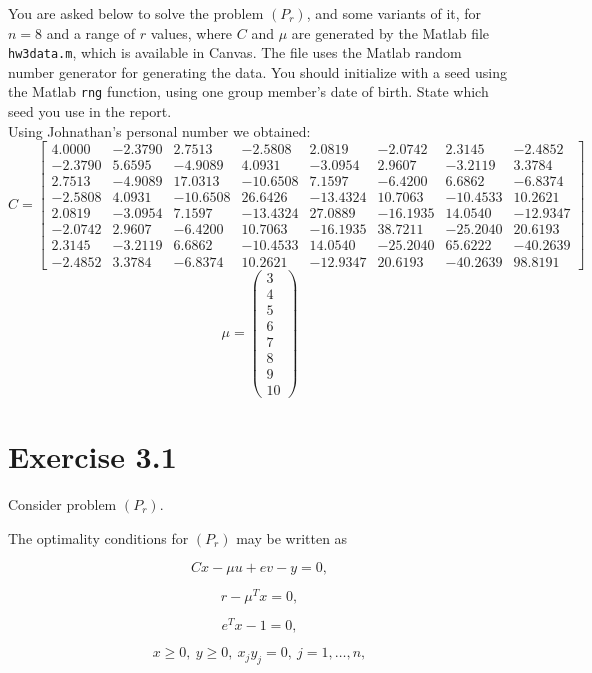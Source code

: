 \documentclass{assignment}
\begin{document}
You are asked below to solve the problem $(P_r)$, and some variants of it, for $n=8$ and a
range of $r$ values, where $C$ and $\mu$ are generated by the Matlab file \texttt{hw3data.m}, which is
available in Canvas. The file uses the Matlab random number generator for generating the
data. You should initialize with a seed using the Matlab \texttt{rng} function, using one group
member's date of birth. State which seed you use in the report.
\\
Using Johnathan's personal number we obtained:
$$ C = 
\begin{bmatrix}
4.0000 & -2.3790 & 2.7513 & -2.5808 & 2.0819 & -2.0742 & 2.3145 & -2.4852 \\
-2.3790 & 5.6595 & -4.9089 & 4.0931 & -3.0954 & 2.9607 & -3.2119 & 3.3784 \\
2.7513 & -4.9089 & 17.0313 & -10.6508 & 7.1597 & -6.4200 & 6.6862 & -6.8374 \\
-2.5808 & 4.0931 & -10.6508 & 26.6426 & -13.4324 & 10.7063 & -10.4533 & 10.2621 \\
2.0819 & -3.0954 & 7.1597 & -13.4324 & 27.0889 & -16.1935 & 14.0540 & -12.9347 \\
-2.0742 & 2.9607 & -6.4200 & 10.7063 & -16.1935 & 38.7211 & -25.2040 & 20.6193 \\
2.3145 & -3.2119 & 6.6862 & -10.4533 & 14.0540 & -25.2040 & 65.6222 & -40.2639 \\
-2.4852 & 3.3784 & -6.8374 & 10.2621 & -12.9347 & 20.6193 & -40.2639 & 98.8191
\end{bmatrix} $$
$$ \mu = \left(\begin{array}{c} 3\\ 4\\ 5\\ 6\\ 7\\ 8\\ 9\\ 10 \end{array}\right)$$
\newpage
\section*{Exercise 3.1}
Consider problem $(P_r)$.

The optimality conditions for $(P_r)$ may be written as

\[
Cx - \mu u + ev - y = 0,
\]

\[
r - \mu^T x = 0,
\]

\[
e^T x - 1 = 0,
\]

\[
x \geq 0, \ y \geq 0, \ x_j y_j = 0, \ j=1,\ldots,n,
\]
\end{document}
